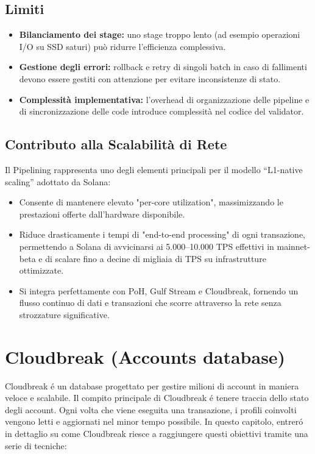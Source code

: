 \documentclass[a4paper,12pt]{report}
\begin{document}
	\subsection{Limiti}
	\begin{itemize}
		\item \textbf{Bilanciamento dei stage:} uno stage troppo lento (ad esempio operazioni I/O su SSD saturi) può ridurre l’efficienza complessiva.
		\item \textbf{Gestione degli errori:} rollback e retry di singoli batch in caso di fallimenti devono essere gestiti con attenzione per evitare inconsistenze di stato.
		\item \textbf{Complessità implementativa:} l’overhead di organizzazione delle pipeline e di sincronizzazione delle code introduce complessità nel codice del validator.
	\end{itemize}
	
	\subsection{Contributo alla Scalabilità di Rete}
	Il Pipelining rappresenta uno degli elementi principali per il modello “L1-native scaling” adottato da Solana:  
	\begin{itemize}
		\item Consente di mantenere elevato "per-core utilization", massimizzando le prestazioni offerte dall’hardware disponibile.  
		\item Riduce drasticamente i tempi di "end-to-end processing" di ogni transazione, permettendo a Solana di avvicinarsi ai 5.000–10.000 TPS effettivi in mainnet-beta e di scalare fino a decine di migliaia di TPS su infrastrutture ottimizzate.  
		\item Si integra perfettamente con PoH, Gulf Stream e Cloudbreak, fornendo un flusso continuo di dati e transazioni che scorre attraverso la rete senza strozzature significative.  
	\end{itemize}
	
	\section{Cloudbreak (Accounts database)}
	Cloudbreak é un database progettato per gestire milioni di account in maniera veloce e scalabile. Il compito principale di Cloudbreak é tenere traccia dello stato degli account. Ogni volta che viene eseguita una transazione, i profili coinvolti vengono letti e aggiornati nel minor tempo possibile. In questo capitolo, entreró in dettaglio su come Cloudbreak riesce a raggiungere questi obiettivi tramite una serie di tecniche:
	
\end{document}
